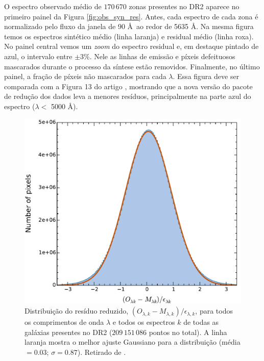 O espectro observado médio de $170\,670$ zonas presentes no DR2 aparece no primeiro painel da Figura \ref{fig:obs_syn_res}. Antes, cada espectro de cada zona é normalizado pelo fluxo da janela de 90 \AA\ ao redor de 5635 \AA. Na mesma figura temos os espectros sintético médio (linha laranja) e residual médio (linha roxa). No painel central vemos um {\em zoom} do espectro residual e, em destaque pintado de azul, o intervalo entre $\pm 3$\%. Nele as linhas de emissão e píxeis defeituosos mascarados durante o processo da síntese estão removidos. Finalmente, no último painel, a fração de píxeis não mascarados para cada $\lambda$. Essa figura deve ser comparada com a Figura 13 do artigo \citet{CidFernandes.etal.2014a}, mostrando que a nova versão do pacote de redução dos dados leva a menores resíduos, principalmente na parte azul do espectro ($\lambda <$ 5000 \AA).

\begin{figure}
	\centering
	\includegraphics[scale=0.4]{figuras/DR2_hist_error.pdf}
	\caption[DR2: Distribuição dos resíduos reduzidos]
	{Distribuição do resíduo reduzido, $(O_{\lambda,k} - M_{\lambda,k})/\epsilon_{\lambda,k}$, para todos os comprimentos de onda $\lambda$ e todos os espectros $k$ de todas as galáxias presentes no DR2 ($209\,151\,086$ pontos no total). A linha laranja mostra o melhor ajuste Gaussiano para a distribuição (média $= 0.03$; $\sigma = 0.87$). Retirado de \citet{GarciaBenito.etal.2015a}.}
	\label{fig:fres_norm_error_distrib}
\end{figure}

